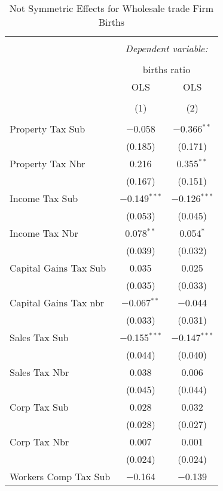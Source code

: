 
\begin{table}[!htbp] \centering 
  \caption{Not Symmetric Effects for  Wholesale trade Firm Births} 
  \label{42noequality} 
\footnotesize 
\begin{tabular}{@{\extracolsep{5pt}}lcc} 
\\[-1.8ex]\hline 
\hline \\[-1.8ex] 
 & \multicolumn{2}{c}{\textit{Dependent variable:}} \\ 
\cline{2-3} 
\\[-1.8ex] & \multicolumn{2}{c}{births ratio} \\ 
 & OLS & OLS \\ 
\\[-1.8ex] & (1) & (2)\\ 
\hline \\[-1.8ex] 
 Property Tax Sub & $-$0.058 & $-$0.366$^{**}$ \\ 
  & (0.185) & (0.171) \\ 
  Property Tax Nbr & 0.216 & 0.355$^{**}$ \\ 
  & (0.167) & (0.151) \\ 
  Income Tax Sub & $-$0.149$^{***}$ & $-$0.126$^{***}$ \\ 
  & (0.053) & (0.045) \\ 
  Income Tax Nbr & 0.078$^{**}$ & 0.054$^{*}$ \\ 
  & (0.039) & (0.032) \\ 
  Capital Gains Tax Sub & 0.035 & 0.025 \\ 
  & (0.035) & (0.033) \\ 
  Capital Gains Tax nbr & $-$0.067$^{**}$ & $-$0.044 \\ 
  & (0.033) & (0.031) \\ 
  Sales Tax Sub & $-$0.155$^{***}$ & $-$0.147$^{***}$ \\ 
  & (0.044) & (0.040) \\ 
  Sales Tax Nbr & 0.038 & 0.006 \\ 
  & (0.045) & (0.044) \\ 
  Corp Tax Sub & 0.028 & 0.032 \\ 
  & (0.028) & (0.027) \\ 
  Corp Tax Nbr & 0.007 & 0.001 \\ 
  & (0.024) & (0.024) \\ 
  Workers Comp Tax Sub & $-$0.164 & $-$0.139 \\ 

\end{tabular}
\end{table}
